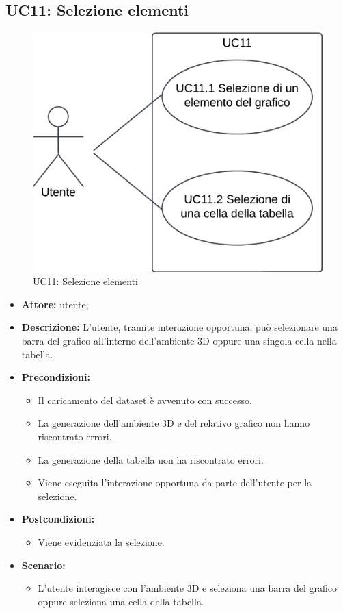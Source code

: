 \subsection{UC11: Selezione elementi}
\begin{figure}[h!]\centering
    \includegraphics[scale=0.7]{template/images/UC11.png}
    \caption{UC11: Selezione elementi}
\end{figure}
\begin{itemize}    
    \item \textbf{Attore:} utente;
    \item \textbf{Descrizione:} L'utente, tramite interazione opportuna, può selezionare una barra del grafico all'interno dell'ambiente 3D oppure una singola cella nella tabella.
    \item \textbf{Precondizioni:}    
        \begin{itemize}
            \item Il caricamento del dataset è avvenuto con successo.
            \item La generazione dell'ambiente 3D e del relativo grafico non hanno riscontrato errori.
            \item La generazione della tabella non ha riscontrato errori.
            \item Viene eseguita l'interazione opportuna da parte dell'utente per la selezione.
        \end{itemize}    
    \item \textbf{Postcondizioni:}
        \begin{itemize}
            \item Viene evidenziata la selezione.
        \end{itemize}    
    \item \textbf{Scenario:} 
        \begin{itemize}
            \item L'utente interagisce con l'ambiente 3D e seleziona una barra del grafico oppure seleziona una cella della tabella.
        \end{itemize}
\end{itemize}

